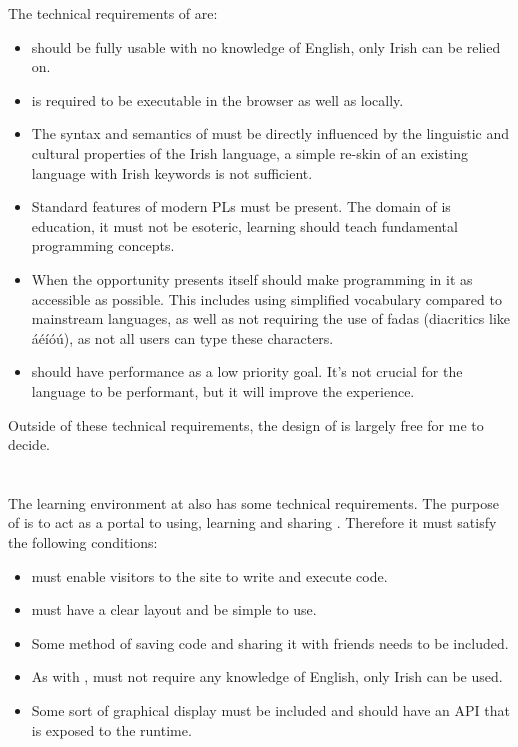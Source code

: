 The technical requirements of \Setanta{} are:
\begin{itemize}
    \item \Setanta{} should be fully usable with no knowledge of English, only Irish can be relied on.
    \item \Setanta{} is required to be executable in the browser as well as locally.
    \item The syntax and semantics of \Setanta{} must be directly influenced by the linguistic and cultural properties of the Irish language, a simple re-skin of an existing language with Irish keywords is not sufficient.
    \item Standard features of modern PLs must be present. The domain of \Setanta{} is education, it must not be esoteric, learning \Setanta{} should teach fundamental programming concepts.
    \item When the opportunity presents itself \Setanta{} should make programming in it as accessible as possible. This includes using simplified vocabulary compared to mainstream languages, as well as not requiring the use of fadas (diacritics like áéíóú), as not all users can type these characters.
    \item \Setanta{} should have performance as a low priority goal. It's not crucial for the language to be performant, but it will improve the experience.
\end{itemize}

Outside of these technical requirements, the design of \Setanta{} is largely free for me to decide.

\section{\trys{}}

The learning environment at \trys{} also has some technical requirements. The purpose of \trys{} is to act as a portal to using, learning and sharing \Setanta{}. Therefore it must satisfy the following conditions:
\begin{itemize}
    \item \trys{} must enable visitors to the site to write and execute \Setanta{} code.
    \item \trys{} must have a clear layout and be simple to use.
    \item Some method of saving code and sharing it with friends needs to be included.
    \item As with \Setanta{}, \trys{} must not require any knowledge of English, only Irish can be used.
    \item Some sort of graphical display must be included and should have an API that is exposed to the \Setanta{} runtime.
\end{itemize}
